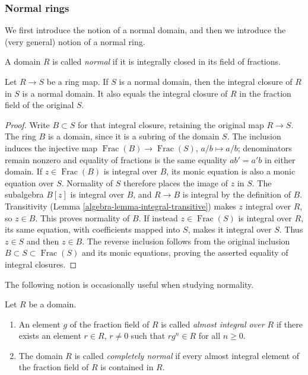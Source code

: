 \subsubsection{Normal rings}
\label{editorial-source-section-normal-rings}

\noindent
We first introduce the notion of a normal domain, and then we
introduce the (very general) notion of a normal ring.

\begin{definition}
\label{editorial-source-definition-domain-normal}
A domain $R$ is called {\it normal} if it is integrally
closed in its field of fractions.
\end{definition}

\begin{lemma}
\label{editorial-source-lemma-integral-closure-in-normal}
Let $R \to S$ be a ring map.
If $S$ is a normal domain, then the integral closure of $R$
in $S$ is a normal domain. It also equals the integral closure
of $R$ in the fraction field of the original $S$.
\end{lemma}

\begin{proof}
Write $B\subset S$ for that integral closure, retaining the
original map $R\to S$. The ring $B$ is a domain, since it is
a subring of the domain $S$. The inclusion induces the injective
map $\operatorname{Frac}(B)\to\operatorname{Frac}(S)$,
$a/b\mapsto a/b$; denominators remain nonzero and equality of
fractions is the same equality $ab'=a'b$ in either domain.
If $z\in\operatorname{Frac}(B)$ is integral over $B$, its monic
equation is also a monic equation over $S$. Normality of $S$
therefore places the image of $z$ in $S$. The subalgebra $B[z]$
is integral over $B$, and $R\to B$ is integral by the definition
of $B$. Transitivity (Lemma \ref{algebra-lemma-integral-transitive}) makes
$z$ integral over $R$, so $z\in B$. This proves normality of $B$.
If instead $z\in\operatorname{Frac}(S)$ is integral over $R$,
its same equation, with coefficients mapped into $S$, makes it
integral over $S$. Thus $z\in S$ and then $z\in B$.
The reverse inclusion follows from the original inclusion
$B\subset S\subset\operatorname{Frac}(S)$ and its monic equations,
proving the asserted equality of integral closures.
\end{proof}

\noindent
The following notion is occasionally useful when
studying normality.

\begin{definition}
\label{editorial-source-definition-almost-integral}
Let $R$ be a domain.
\begin{enumerate}
\item An element $g$ of the fraction
field of $R$ is called {\it almost integral over $R$}
if there exists an element $r \in R$, $r\not = 0$
such that $rg^n \in R$ for all $n \geq 0$.
\item The domain $R$ is called {\it completely normal} if every
almost integral element of the fraction field of $R$ is
contained in $R$.
\end{enumerate}
\end{definition}

